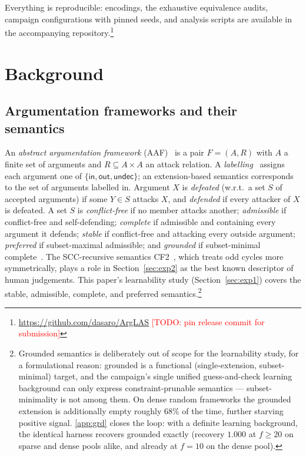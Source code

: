 \documentclass[review,12pt]{elsarticle}
\theoremstyle{definition}
\theoremstyle{remark}
\newcommand{\todo}[1]{\textcolor{red}{[TODO: #1]}}
\newcommand{\pred}[1]{\textsf{#1}}
\begin{document}
Everything is reproducible: encodings, the exhaustive equivalence audits, campaign
configurations with pinned seeds, and analysis scripts are available in the
accompanying repository.\footnote{\url{https://github.com/dasaro/ArgLAS}
\todo{pin release commit for submission}}

\section{Background}
\label{sec:background}

\subsection{Argumentation frameworks and their semantics}
\label{sec:bg-af}

An \emph{abstract argumentation framework} (AAF)~\citep{dung1995} is a pair
$F=(A,R)$ with $A$ a finite set of arguments and $R\subseteq A\times A$ an
attack relation. A \emph{labelling}~\citep{caminada2006} assigns each argument
one of $\{\pred{in},\pred{out},\pred{undec}\}$; an extension-based semantics
corresponds to the set of arguments labelled \pred{in}. Argument $X$ is
\emph{defeated} (w.r.t.\ a set $S$ of accepted arguments) if some $Y\in S$
attacks $X$, and \emph{defended} if every attacker of $X$ is defeated. A set
$S$ is \emph{conflict-free} if no member attacks another; \emph{admissible} if
conflict-free and self-defending; \emph{complete} if admissible and containing
every argument it defends; \emph{stable} if conflict-free and attacking every
outside argument; \emph{preferred} if subset-maximal admissible; and
\emph{grounded} if subset-minimal complete~\citep{baroni2011}. The
SCC-recursive semantics CF2~\citep{baroni2005}, which treats odd cycles more
symmetrically, plays a role in Section~\ref{sec:exp2} as the best known
descriptor of human judgements. This paper's learnability study
(Section~\ref{sec:exp1}) covers the stable, admissible, complete, and preferred
semantics.\footnote{Grounded semantics is deliberately out of scope for the
learnability study, for a formulational reason: grounded is a functional
(single-extension, subset-minimal) target, and the campaign's single unified
guess-and-check learning background can only express constraint-prunable
semantics --- subset-minimality is not among them. On dense random frameworks
the grounded extension is additionally empty roughly $68\%$ of the time,
further starving positive signal. \ref{app:grd} closes the loop: with a
definite learning background, the identical harness recovers grounded exactly
(recovery $1.000$ at $f\ge20$ on sparse and dense pools alike, and already at
$f{=}10$ on the dense pool).}
\end{document}
